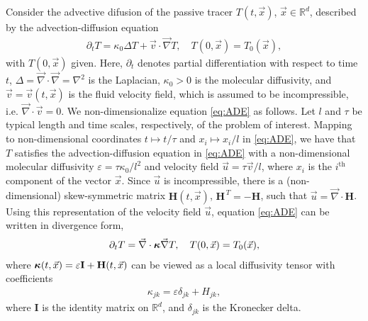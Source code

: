 \documentclass[11pt]{amsart}
\newcommand{\Hb}{\mathbf{H}}
\newcommand{\Ib}{\mathbf{I}}
\newcommand\bkappa{\mbox{\boldmath${\kappa}$}}
\begin{document}
Consider the advective difusion of the passive tracer $T(t,\vec{x})$,
$\vec{x}\in\mathbb{R}^d$, described by the advection-diffusion equation
%
\begin{align}\label{eq:ADE}
  \partial_tT=\kappa_0\Delta T+\vec{v}\cdot\vec{\nabla}T, \quad
  T(0,\vec{x})=T_0(\vec{x}),
\end{align}
%
with $T(0,\vec{x})$ given. Here, $\partial_t$ denotes partial differentiation
with respect to time $t$, $\Delta=\vec{\nabla}\cdot\vec{\nabla}=\nabla^2$ is the Laplacian,
$\kappa_0>0$ is the molecular diffusivity, and $\vec{v}=\vec{v}(t,\vec{x})$
is the fluid velocity field, which is assumed to be incompressible,
i.e. $\vec{\nabla}\cdot\vec{v}=0$. We non-dimensionalize equation
\eqref{eq:ADE} as follows. Let $l$ and $\tau$ be typical length and time
scales, respectively, of the problem of interest. Mapping to
non-dimensional coordinates $t\mapsto t/\tau$ and $x_i\mapsto x_i/l$ in
\eqref{eq:ADE}, we have that $T$ satisfies the advection-diffusion
equation in \eqref{eq:ADE} with a non-dimensional molecular
diffusivity $\varepsilon=\tau\kappa_0/l^2$ and velocity field $\vec{u}=\tau\vec{v}/l$,
where $x_i$ is the $i^{\text{th}}$ component of the vector
$\vec{x}$. Since $\vec{u}$ is incompressible, there is a
(non-dimensional) skew-symmetric matrix $\Hb(t,\vec{x})$,
$\Hb^{\,T}=-\Hb$, such that $\vec{u}=\vec{\nabla}\cdot\Hb$. 
Using this representation of the velocity field $\vec{u}$, equation
\eqref{eq:ADE} can be written in divergence form, 
%
\begin{align}\label{eq:ADE_Divergence}
  \partial_tT%
    =\vec{\nabla}\cdot\bkappa\vec{\nabla}T, \quad
    T(0,\vec{x})=T_0(\vec{x}),
\end{align}
%
where $\bkappa(t,\vec{x})=\varepsilon\Ib+\Hb(t,\vec{x})$ can be viewed as a local
diffusivity tensor with coefficients
%
\begin{align}\label{eq:kappa_coeff}
  \kappa_{jk}=\varepsilon\delta_{jk}+H_{jk},
\end{align}
%
where $\Ib$ is the identity matrix on $\mathbb{R}^d$, and $\delta_{jk}$ is 
the Kronecker delta. 
\end{document}
